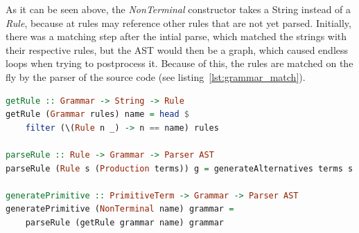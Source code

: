 As it can be seen above, the \textit{NonTerminal} constructor takes a String instead of a \textit{Rule}, because at rules may reference other rules that are not yet parsed. Initially, there was a matching step after the intial parse, which matched the strings with their respective rules, but the AST would then be a graph, which caused endless loops when trying to postprocess it. Because of this, the rules are matched on the fly by the parser of the source code (see listing~\ref{lst:grammar_match}).

\begin{lstlisting}[linewidth=\columnwidth, caption={Rule matching while parsing}, captionpos=b, label=lst:adt_abnf, language=Haskell, breaklines=true]
getRule :: Grammar -> String -> Rule
getRule (Grammar rules) name = head $
    filter (\(Rule n _) -> n == name) rules

parseRule :: Rule -> Grammar -> Parser AST
parseRule (Rule s (Production terms)) g = generateAlternatives terms s g

generatePrimitive :: PrimitiveTerm -> Grammar -> Parser AST
generatePrimitive (NonTerminal name) grammar =
    parseRule (getRule grammar name) grammar
\end{lstlisting}

